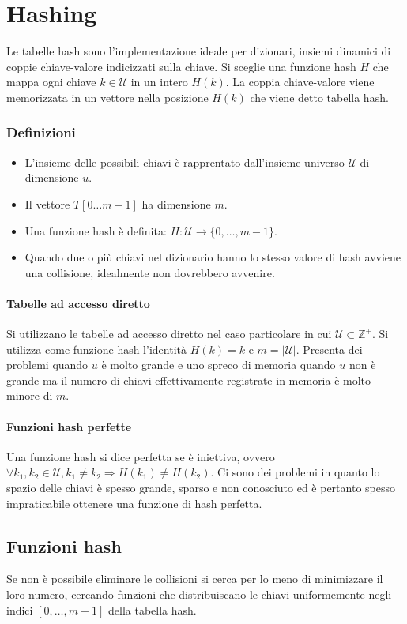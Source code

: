 \chapter{Hashing}
Le tabelle hash sono l'implementazione ideale per dizionari, insiemi dinamici di coppie chiave-valore indicizzati sulla chiave. Si sceglie una funzione hash
$H$ che mappa ogni chiave $k\in\mathcal{U}$ in un intero $H(k)$. La coppia chiave-valore viene memorizzata in un vettore nella posizione $H(k)$ che viene
detto tabella hash.
\subsection{Definizioni}
\begin{itemize}
\item L'insieme delle possibili chiavi \`e rapprentato dall'insieme universo $\mathcal{U}$ di dimensione $u$.
\item Il vettore $T[0\dots m-1]$ ha dimensione $m$.
\item Una funzione hash \`e definita: $H: \mathcal{U}\rightarrow\{0,\dots, m-1\}$.
\item Quando due o pi\`u chiavi nel dizionario hanno lo stesso valore di hash avviene una collisione, idealmente non dovrebbero avvenire.
\end{itemize}
\subsubsection{Tabelle ad accesso diretto}
Si utilizzano le tabelle ad accesso diretto nel caso particolare in cui $\mathcal{U}\subset\mathbb{Z}^+$. Si utilizza come funzione hash l'identit\`a 
$H(k)=k$ e $m=|\mathcal{U}|$. Presenta dei problemi quando $u$ \`e molto grande e uno spreco di memoria quando $u$ non \`e grande ma il numero di chiavi 
effettivamente registrate in memoria \`e molto minore di $m$. 
\subsubsection{Funzioni hash perfette}
Una funzione hash si dice perfetta se \`e iniettiva, ovvero $\forall k_1, k_2\in\mathcal{U}, k_1\neq k_2\Rightarrow H(k_1)\neq H(k_2)$. Ci sono dei problemi
in quanto lo spazio delle chiavi \`e spesso grande, sparso e non conosciuto ed \`e pertanto spesso impraticabile ottenere una funzione di hash perfetta. 
\section{Funzioni hash}
Se non \`e possibile eliminare le collisioni si cerca per lo meno di minimizzare il loro numero, cercando funzioni che distribuiscano le chiavi 
uniformemente negli indici $[0,\dots,m-1]$ della tabella hash.
